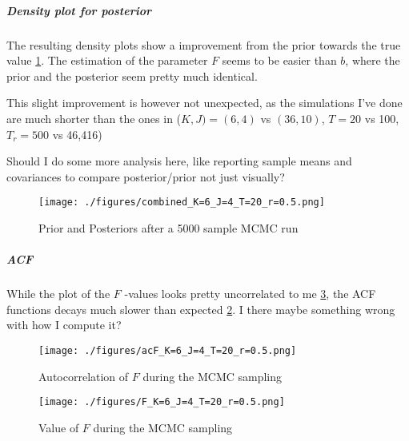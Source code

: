 \documentclass[11pt]{article}
\begin{document}
\subparagraph{Density plot for posterior}
\label{sec:orge10acf4}

The resulting density plots show a improvement from the prior towards the true value \ref{fig:lorenz_densities}.
The estimation of the parameter \(F\) seems to be easier than \(b\), where the prior and the
posterior seem pretty much identical.

This slight improvement is however not unexpected, as the simulations I've done are much shorter than
the ones in \cite{schneider_earth_2017} (\(K, J) = (6,4)\) vs \((36, 10)\), \(T = 20\) vs 100, \(T_r = 500\) vs 46,416)

Should I do some more analysis here, like reporting sample means and covariances to compare
posterior/prior not just visually?

\begin{figure}[htbp]
\centering
\texttt{[image: ./figures/combined\_K=6\_J=4\_T=20\_r=0.5.png]}
\caption{\label{fig:lorenz_densities}
Prior and Posteriors after a 5000 sample MCMC run}
\end{figure}

\subparagraph{ACF}
\label{sec:orgfc785db}

While the plot of the \(F\) -values looks pretty uncorrelated to me \ref{fig:lorenz_F}, the ACF functions
decays much slower than expected \ref{fig:lorenz_acF}. I there maybe something wrong with how I compute it?

\begin{figure}[htbp]
\centering
\texttt{[image: ./figures/acF\_K=6\_J=4\_T=20\_r=0.5.png]}
\caption{\label{fig:lorenz_acF}
Autocorrelation of \(F\) during the MCMC sampling}
\end{figure}

\begin{figure}[htbp]
\centering
\texttt{[image: ./figures/F\_K=6\_J=4\_T=20\_r=0.5.png]}
\caption{\label{fig:lorenz_F}
Value of \(F\) during the MCMC sampling}
\end{figure}



\end{document}
